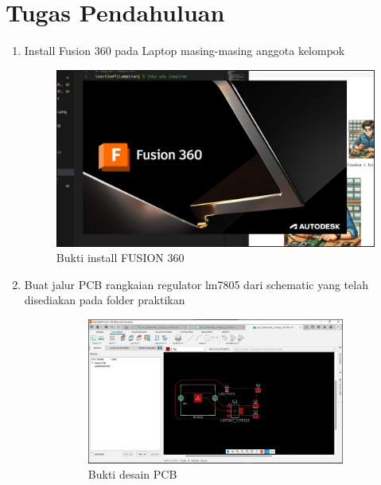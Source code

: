 \section*{Tugas Pendahuluan}
\begin{enumerate}
  \item Install Fusion 360 pada Laptop masing-masing anggota kelompok \\
  \begin{figure}[H]
    \centering
    \includegraphics[width=0.6\linewidth]{img/buktidownloadfusion360.jpg}
    \caption{Bukti install FUSION 360} 
  \end{figure}
  \item Buat jalur PCB rangkaian regulator lm7805 dari schematic yang telah disediakan
  pada folder praktikan \\
  \begin{figure}[H]
    \centering
    \begin{subfigure}[b]{0.45\linewidth}
      \centering
      \includegraphics[width=\linewidth]{img/buatpcb.jpg}
      \caption{Bukti desain PCB\label{fig:inisub1}}
    \end{subfigure}
    \hspace{1cm}
    \begin{subfigure}[b]{0.45\linewidth}

\end{subfigure}
\end{figure}
\end{enumerate}
